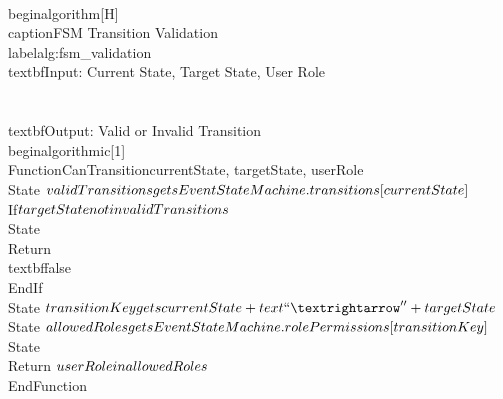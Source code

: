 \\begin{algorithm}[H]
\\caption{FSM Transition Validation}
\\label{alg:fsm_validation}
\\textbf{Input:} Current State, Target State, User Role\\\\
\\textbf{Output:} Valid or Invalid Transition
\\begin{algorithmic}[1]
\\Function{CanTransition}{currentState, targetState, userRole}
    \\State $validTransitions \\gets EventStateMachine.transitions[currentState]$
    \\If{$targetState \\notin validTransitions$}
        \\State \\Return \\textbf{false}
    \\EndIf
    \\State $transitionKey \\gets currentState + \\text{`` → ''} + targetState$
    \\State $allowedRoles \\gets EventStateMachine.rolePermissions[transitionKey]$
    \\State \\Return $userRole \\in allowedRoles$
\\EndFunction

